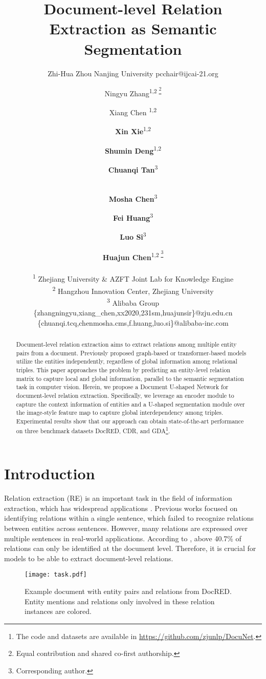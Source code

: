 \documentclass{article}
\title{Document-level Relation Extraction as Semantic Segmentation}
\author{
    Zhi-Hua Zhou
    \affiliations
    Nanjing University
    \emails
    pcchair@ijcai-21.org
}
\author{
Ningyu Zhang\textsuperscript{\rm 1,2 \thanks{ \quad Equal contribution and shared co-first authorship.} } \and 
Xiang Chen \textsuperscript{\rm 1,2 \footnotemark[1]} \and
\textbf{Xin Xie}\textsuperscript{\rm 1,2}  \and
\textbf{Shumin Deng}\textsuperscript{\rm 1,2} \and
\textbf{Chuanqi Tan}\textsuperscript{\rm 3} \and \\
\textbf{Mosha Chen}\textsuperscript{\rm 3} \and 
\textbf{Fei Huang}\textsuperscript{\rm 3} \and
\textbf{Luo Si}\textsuperscript{\rm 3} \and
\textbf{Huajun Chen}\textsuperscript{\rm 1,2 \thanks{\quad Corresponding author.}} \\
\affiliations

\textsuperscript{\rm 1} Zhejiang University \& AZFT Joint Lab for Knowledge Engine \\
\textsuperscript{\rm 2} 
Hangzhou Innovation Center, Zhejiang University \\
\textsuperscript{\rm 3} Alibaba Group\\

\emails
 \{zhangningyu,xiang\_chen,xx2020,231sm,huajunsir\}@zju.edu.cn \\
 \{chuanqi.tcq,chenmosha.cms,f.huang,luo.si\}@alibaba-inc.com \\
}
\begin{document}
\maketitle

\begin{abstract}
Document-level relation extraction aims to extract relations among multiple entity pairs from a document. Previously proposed graph-based or transformer-based models utilize the entities independently, regardless of global information among relational triples. This paper approaches the problem by predicting an entity-level relation matrix to capture local and global information, parallel to the semantic segmentation task in computer vision. Herein, we propose a Document U-shaped Network for document-level relation extraction. Specifically, we leverage an encoder module to capture the context information of entities and a U-shaped segmentation module over the image-style feature map to capture global interdependency among triples. Experimental results show that our approach can obtain state-of-the-art performance on three benchmark datasets DocRED, CDR, and GDA\footnote{The code and datasets are available in \url{https://github.com/zjunlp/DocuNet}.}.
\end{abstract}


\section{Introduction} 

Relation extraction (RE) is an important task in the field of information extraction, which has widespread applications \cite{zhang2021cause,zhang2021alicg}. Previous works \cite{zeng2015distant,feng2018reinforcement} focused on identifying relations within a single sentence, which failed to recognize relations between entities across sentences.
However, many relations are expressed over multiple sentences in real-world applications. According to \cite{Yao2019DocREDAL}, above 40.7\% of relations can only be identified at the document level. Therefore, it is crucial for models to be able to extract document-level relations. 
\begin{figure}[h]
  \centering 
  \texttt{[image: task.pdf]} 
  \caption{Example document with entity pairs and relations from DocRED. Entity mentions and relations only involved in these relation instances are colored.}
 \label{task}
\end{figure}
\end{document}
